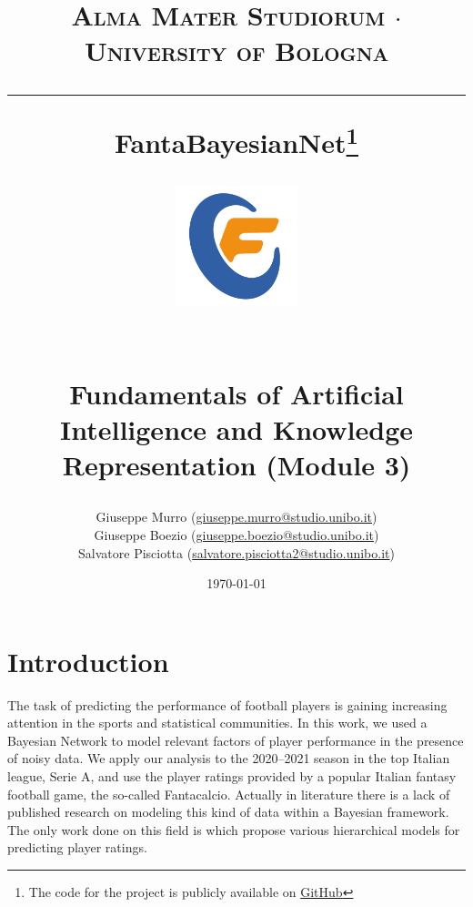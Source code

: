 \documentclass[a4paper,10pt]{report}
\begin{document}
\frenchspacing


\title{
  {{\large{\textsc{Alma Mater Studiorum $\cdot$ University of Bologna}}}}
  \rule{\textwidth}{0.4pt}\vspace{3mm}
  \textbf{FantaBayesianNet\footnote{The code for the project is publicly available on \href{https://github.com/giuseppeboezio/FantaBayesianNet}{GitHub}}}
  \begin{figure}[!htb]
    \centering
    \includegraphics[width = 100pt]{fantacalcio-icon}
  \end{figure} \\
  Fundamentals of Artificial Intelligence and Knowledge Representation (Module 3)
}

\author{ Giuseppe Murro (\href{mailto:giuseppe.murro@studio.unibo.it}{giuseppe.murro@studio.unibo.it}) \\ Giuseppe Boezio (\href{mailto:giuseppe.boezio@studio.unibo.it}{giuseppe.boezio@studio.unibo.it}) \\ Salvatore Pisciotta (\href{mailto:salvatore.pisciotta2@studio.unibo.it}{salvatore.pisciotta2@studio.unibo.it})}
\date{\today}
\maketitle
\newpage
\tableofcontents
\setcounter{tocdepth}{1}
\newpage



\chapter{Introduction}\label{chap:introduction}

The task of predicting the performance of football players is gaining increasing attention in the sports and statistical communities. In this work, we used a Bayesian Network to model relevant factors of player performance in the presence of noisy data. We apply our analysis to the 2020–2021 season in the top Italian league, Serie A, and use the player ratings provided by a popular Italian fantasy football game, the so-called Fantacalcio.
Actually in literature there is a lack of published research on modeling this kind of data
within a Bayesian framework. The only work done on this field is \cite{bayesian_edigi_gabry} which propose various hierarchical models for predicting player ratings.
\end{document}
